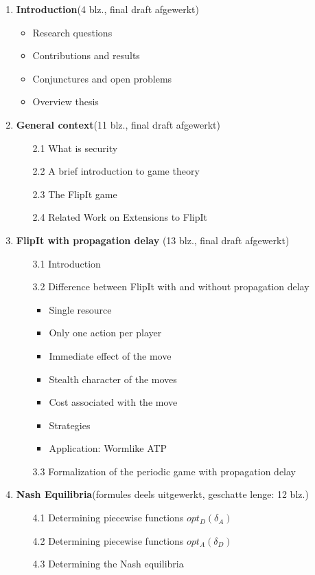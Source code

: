 \documentclass[a4paper, 11pt]{article}
\begin{document}
\begin{enumerate}
\item \textbf{Introduction}(4 blz., final draft afgewerkt) 
\begin{itemize}
\item Research questions
\item Contributions and results
\item Conjunctures and open problems
\item Overview thesis
\end{itemize}
\item \textbf{General context}(11 blz., final draft afgewerkt)
\begin{itemize}
\item[2.1] What is security
\item[2.2] A brief introduction to game theory
\item[2.3] The FlipIt game
\item[2.4] Related Work on Extensions to FlipIt
\end{itemize}
\item \textbf{FlipIt with propagation delay} (13 blz., final draft afgewerkt)
\begin{itemize}
\item[3.1] Introduction
\item[3.2] Difference between FlipIt with and without propagation delay
\begin{itemize}
\item Single resource
\item Only one action per player
\item Immediate effect of the move
\item Stealth character of the moves
\item Cost associated with the move
\item Strategies
\item Application: Wormlike ATP
\end{itemize}
\item[3.3] Formalization of the periodic game with propagation delay
\end{itemize}
\item \textbf{Nash Equilibria}(formules deels uitgewerkt, geschatte lenge: 12 blz.)
\begin{itemize}
\item[4.1] Determining piecewise functions $opt_{D}(\delta_{A})$
\item[4.2] Determining piecewise functions $opt_{A}(\delta_{D})$
\item[4.3] Determining the Nash equilibria

\end{itemize}
\end{enumerate}
\end{document}
